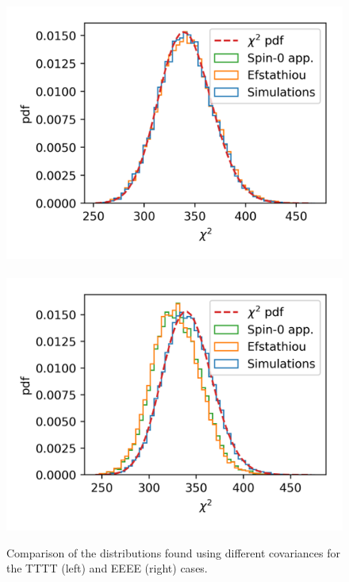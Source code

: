 \documentclass[a4paper,11pt]{article}
\begin{document}
\begin{figure} %
  \centering
  \includegraphics[width=\columnwidth]{./figures/run_sph_ALL_TTTT_chi2.png}~
  \includegraphics[width=\columnwidth]{./figures/run_sph_ALL_EEEE_chi2.png}
  \caption{Comparison of the distributions found using different
    covariances for the TTTT (left) and EEEE (right) cases.}
  \label{fig:TTTT_EEEE_chi2}
\end{figure}
\end{document}
